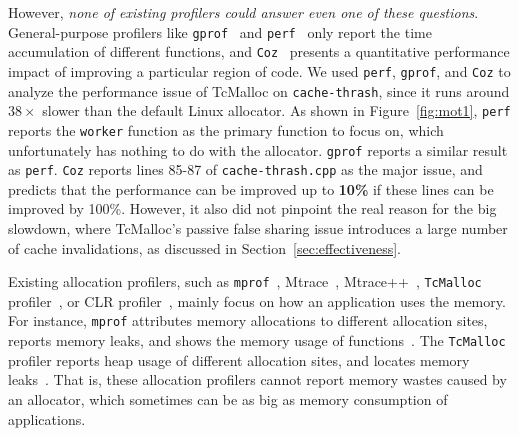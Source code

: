However, \textit{none of existing profilers could answer even one of these questions}. General-purpose profilers like \texttt{gprof}~\cite{DBLP:conf/sigplan/GrahamKM82} and \texttt{perf}~\cite{perf} only report the time accumulation of different functions, and \texttt{Coz}~\cite{Coz} presents a quantitative performance impact of improving a particular region of code. We used \texttt{perf}, \texttt{gprof}, and \texttt{Coz} to analyze the performance issue of TcMalloc on \texttt{cache-thrash}, since it runs around $38\times$ slower than the default Linux allocator. As shown in Figure~\ref{fig:mot1}, \texttt{perf} reports the \texttt{worker} function as the primary function to focus on, which unfortunately has nothing to do with the allocator. \texttt{gprof} reports a similar result as \texttt{perf}. \texttt{Coz} reports lines 85-87 of \texttt{cache-thrash.cpp} as the major issue, and predicts that the performance can be improved up to \textbf{10\%} if these lines can be improved by 100\%. However, it 
also did not pinpoint the real reason for the big slowdown, where TcMalloc's passive false sharing issue introduces a large number of cache invalidations, as discussed in Section~\ref{sec:effectiveness}. 


Existing allocation profilers, such as \texttt{mprof}~\cite{Zorn:1988:MAP:894814}, Mtrace~\cite{mtrace}, Mtrace++~\cite{Lee:2000:DMM:786772.787150}, \texttt{TcMalloc} profiler~\cite{tcmalloc-profiler}, or CLR profiler~\cite{lupasc2014dynamic}, mainly focus on how an application uses the memory. For instance, \texttt{mprof} attributes memory allocations to different allocation sites, reports memory leaks, and shows the memory usage of functions~\cite{Zorn:1988:MAP:894814}. The \texttt{TcMalloc} profiler reports heap usage of different allocation sites, and locates memory leaks~\cite{tcmalloc-profiler}. That is, these allocation profilers cannot report memory wastes caused by an allocator, which sometimes can be as big as memory consumption of applications. 

